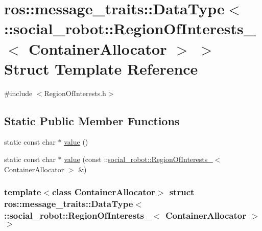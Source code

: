 \hypertarget{structros_1_1message__traits_1_1DataType_3_01_1_1social__robot_1_1RegionOfInterests___3_01ContainerAllocator_01_4_01_4}{
\section{ros::message\_\-traits::DataType$<$ ::social\_\-robot::RegionOfInterests\_\-$<$ ContainerAllocator $>$ $>$ Struct Template Reference}
\label{structros_1_1message__traits_1_1DataType_3_01_1_1social__robot_1_1RegionOfInterests___3_01ContainerAllocator_01_4_01_4}
}


{\ttfamily \#include $<$RegionOfInterests.h$>$}

\subsection*{Static Public Member Functions}
\begin{DoxyCompactItemize}
\item 
static const char $\ast$ \hyperlink{structros_1_1message__traits_1_1DataType_3_01_1_1social__robot_1_1RegionOfInterests___3_01ContainerAllocator_01_4_01_4_af18cebf248ea6052db090fe303643fa8}{value} ()
\item 
static const char $\ast$ \hyperlink{structros_1_1message__traits_1_1DataType_3_01_1_1social__robot_1_1RegionOfInterests___3_01ContainerAllocator_01_4_01_4_ad68d4a33929956d4bfd594ac494a581e}{value} (const ::\hyperlink{structsocial__robot_1_1RegionOfInterests__}{social\_\-robot::RegionOfInterests\_\-}$<$ ContainerAllocator $>$ \&)
\end{DoxyCompactItemize}
\subsubsection*{template$<$class ContainerAllocator$>$ struct ros::message\_\-traits::DataType$<$ ::social\_\-robot::RegionOfInterests\_\-$<$ ContainerAllocator $>$ $>$}



